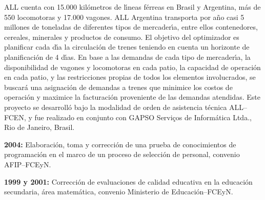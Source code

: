 ALL cuenta con 15.000 kil\'ometros de l\'{\i}neas f\'erreas en
Brasil y Argentina, m\'as de 550 locomotoras y 17.000 vagones. ALL
Argentina transporta por a\~no casi 5 millones de toneladas de
diferentes tipos de mercader\'{\i}a, entre ellos contenedores,
cereales, minerales y productos de consumo. El objetivo del
optimizador es planificar cada d\'{\i}a la circulaci\'on de trenes
teniendo en cuenta un horizonte de planificaci\'on de 4 d\'{\i}as.
En base a las demandas de cada tipo de mercader\'{\i}a, la
disponibilidad de vagones y locomotoras en cada patio, la
capacidad de operaci\'on en cada patio, y las restricciones
propias de todos los elementos involucrados, se buscar\'a una
asignaci\'on de demandas a trenes que minimice los costos de
operaci\'on y maximice la facturaci\'on proveniente de las
demandas atendidas. Este proyecto se desarroll\'o bajo la
modalidad de orden de asistencia t\'ecnica ALL--FCEN, y fue
realizado en conjunto con GAPSO Servi\c{c}os de Inform\'atica
Ltda., Rio de Janeiro, Brasil.

\item \textbf{2004:} Elaboraci\'on, toma y correcci\'on de una
prueba de conocimientos de programaci\'on en el marco de un
proceso de selecci\'on de personal, convenio AFIP--FCEyN.


\item \textbf{1999 y 2001:} Correcci\'on de evaluaciones de
calidad educativa en la educaci\'on secundaria, \'area
matem\'atica, convenio Ministerio de Educaci\'on--FCEyN.
